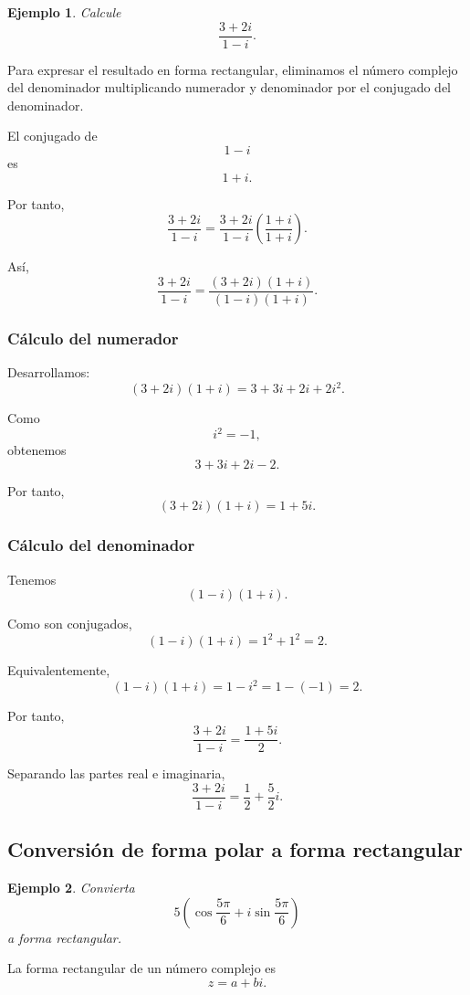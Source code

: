 \documentclass[12pt]{article}
\newtheorem{Ejem}{Ejemplo}
\begin{document}
\begin{Ejem}
Calcule
\[
\frac{3+2i}{1-i}.
\]
\end{Ejem}

Para expresar el resultado en forma rectangular, eliminamos
el número complejo del denominador multiplicando numerador y
denominador por el conjugado del denominador.

El conjugado de
\[
1-i
\]
es
\[
1+i.
\]

Por tanto,
\[
\frac{3+2i}{1-i}
=
\frac{3+2i}{1-i}
\left(
\frac{1+i}{1+i}
\right).
\]

Así,
\[
\frac{3+2i}{1-i}
=
\frac{(3+2i)(1+i)}
     {(1-i)(1+i)}.
\]

\subsubsection*{Cálculo del numerador}

Desarrollamos:
\[
(3+2i)(1+i)
=
3+3i+2i+2i^2.
\]

Como
\[
i^2=-1,
\]
obtenemos
\[
3+3i+2i-2.
\]

Por tanto,
\[
(3+2i)(1+i)=1+5i.
\]

\subsubsection*{Cálculo del denominador}

Tenemos
\[
(1-i)(1+i).
\]

Como son conjugados,
\[
(1-i)(1+i)
=
1^2+1^2
=
2.
\]

Equivalentemente,
\[
(1-i)(1+i)
=
1-i^2
=
1-(-1)
=
2.
\]

Por tanto,
\[
\frac{3+2i}{1-i}
=
\frac{1+5i}{2}.
\]

Separando las partes real e imaginaria,
\[
\boxed{
\frac{3+2i}{1-i}
=
\frac12+\frac52i
}.
\]

\subsection{Conversión de forma polar a forma rectangular}

\begin{Ejem}
Convierta
\[
5\left(
\cos\frac{5\pi}{6}
+i\sin\frac{5\pi}{6}
\right)
\]
a forma rectangular.
\end{Ejem}

La forma rectangular de un número complejo es
\[
z=a+bi.
\]
\end{document}

